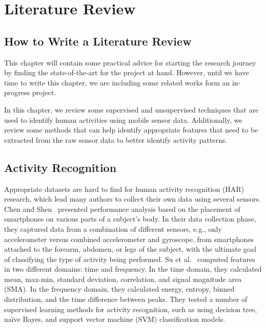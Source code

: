 \section{Literature Review}\label{sec:literature_review}

\subsection{How to Write a Literature Review}\label{sec:literature_review:howto}

This chapter will contain some practical advice for starting the research journey by finding the state-of-the-art for the project at hand. However, until we have time to write this chapter, we are including some related works form an in-progress project.

In this chapter, we review some supervised and unsupervised techniques that are used to identify human activities using mobile sensor data. Additionally, we review some methods that can help identify appropriate features that need to be extracted from the raw sensor data to better identify activity patterns.

\subsection{Activity Recognition}
Appropriate datasets are hard to find for human activity recognition (HAR) research, which lead many authors to collect their own data using several sensors. Chen and Shen~\cite{chen2017} presented performance analysis based on the placement of smartphones on various parts of a subject's body. In their data collection phase, they captured data from a combination of different sensors, e.g., only accelerometer versus combined accelerometer and gyroscope, from smartphones attached to the forearm, abdomen, or legs of the subject, with the ultimate goal of classifying the type of activity being performed.
Su et al.~\cite{su2014} computed features in two different domains: time and frequency. In the time domain, they calculated mean, max-min, standard deviation, correlation, and signal magnitude area (SMA). In the frequency domain, they calculated energy, entropy, binned distribution, and the time difference between peaks. They tested a number of supervised learning methods for activity recognition, such as using decision tree, na\"{i}ve Bayes, and support vector machine (SVM) classification models. 

